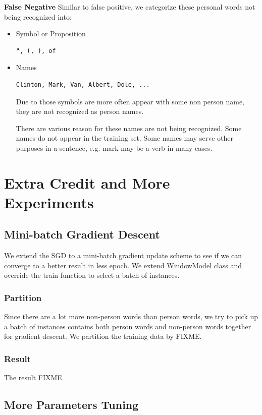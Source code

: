 \documentclass[letterpaper]{article}
\begin{document}
\textbf{False Negative} Similar to false positive, we categorize these personal words not being recognized into:
\begin{itemize}
\item Symbol or Proposition
\begin{verbatim}
", (, ), of
\end{verbatim}
\item Names
\begin{verbatim}
Clinton, Mark, Van, Albert, Dole, ...
\end{verbatim}

Due to those symbols are more often appear with some non person name, they are not recognized as person names.

There are various reason for these names are not being recognized. Some names do not appear in the training set. Some names may serve other purposes in a sentence, e.g. mark may be a verb in many cases.
\end{itemize}
\section{Extra Credit and More Experiments}
\subsection{Mini-batch Gradient Descent}
We extend the SGD to a mini-batch gradient update scheme to see if we can converge to a better result in less epoch. We extend WindowModel class and override the train function to select a batch of instances.
\subsubsection{Partition}
Since there are a lot more non-person words than person words, we try to pick up a batch of instances contains both person words and non-person words together for gradient descent. We partition the training data by FIXME.
\subsubsection{Result}
The result FIXME
\subsection{More Parameters Tuning}
\end{document}
